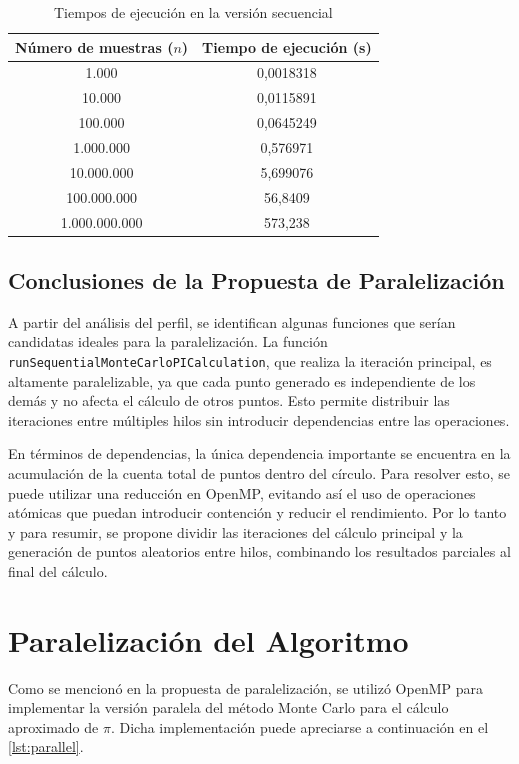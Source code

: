 \documentclass[a4paper, 10pt, onecolumn]{IEEEtran}
\begin{document}
\begin{table}[H]
  \centering
  \begin{tabular}{|c|c|}
    \hline
    \textbf{Número de muestras ($n$)} & \textbf{Tiempo de ejecución (s)} \\
    \hline
    1.000         & 0,0018318 \\
    10.000        & 0,0115891 \\
    100.000       & 0,0645249 \\
    1.000.000     & 0,576971 \\
    10.000.000    & 5,699076 \\
    100.000.000   & 56,8409 \\
    1.000.000.000 & 573,238 \\
    \hline
  \end{tabular}
  \caption{Tiempos de ejecución en la versión secuencial}
  \label{tab:sequential_execution_times}
\end{table}

\subsection{Conclusiones de la Propuesta de Paralelización}
A partir del análisis del perfil, se identifican algunas funciones que serían candidatas ideales para la paralelización. La función \texttt{runSequentialMonteCarloPICalculation}, que realiza la iteración principal, es altamente paralelizable, ya que cada punto generado es independiente de los demás y no afecta el cálculo de otros puntos. Esto permite distribuir las iteraciones entre múltiples hilos sin introducir dependencias entre las operaciones.

En términos de dependencias, la única dependencia importante se encuentra en la acumulación de la cuenta total de puntos dentro del círculo. Para resolver esto, se puede utilizar una reducción en OpenMP, evitando así el uso de operaciones atómicas que puedan introducir contención y reducir el rendimiento. Por lo tanto y para resumir, se propone dividir las iteraciones del cálculo principal y la generación de puntos aleatorios entre hilos, combinando los resultados parciales al final del cálculo.

\section{Paralelización del Algoritmo}
Como se mencionó en la propuesta de paralelización, se utilizó OpenMP para implementar la versión paralela del método Monte Carlo para el cálculo aproximado de $\pi$. Dicha implementación puede apreciarse a continuación en el \cref{lst:parallel}.
\end{document}
